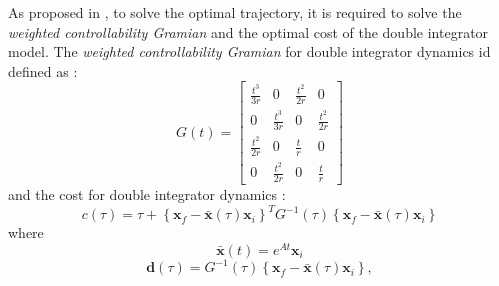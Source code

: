 \documentclass[conference]{IEEEtran}
\begin{document}
As proposed in \cite{webb2013kinodynamic}, to solve the optimal trajectory, it is required to solve the \emph{weighted controllability Gramian} and the optimal cost of the double integrator model. The \emph{weighted controllability Gramian} for double integrator dynamics id defined as :
\begin{equation} \label{dbl_int_gramian_eq}
G(t)=\begin{bmatrix}
\frac{t^{3}}{3r} & 0 & \frac{t^{2}}{2r} & 0 \\
0 & \frac{t^{3}}{3r} & 0 & \frac{t^{2}}{2r} \\
\frac{t^{2}}{2r} & 0 & \frac{t}{r} & 0\\
0 & \frac{t^{2}}{2r} & 0 & \frac{t}{r}
\end{bmatrix}
\end{equation}
and the cost for double integrator dynamics :
\begin{equation} \label{dbl_int_cost_eq}
c(\tau) =
\tau +
\left \{  
\boldsymbol{x}_f -
\bar{\boldsymbol{x}}(\tau)
\boldsymbol{x}_i
\right \}^{T}
G^{-1}(\tau)
\left \{  
\boldsymbol{x}_f -
\bar{\boldsymbol{x}}(\tau)
\boldsymbol{x}_i
\right \}
\end{equation}
where
\begin{equation} \label{ext_dbl_int_eq}
\bar{\boldsymbol{x}}(t) =
e^{At} \boldsymbol{x}_i 
\end{equation}
\begin{equation} \label{d_sym_dbl_int_eq}
\boldsymbol{d}(\tau) =
G^{-1}(\tau)
\left \{
\boldsymbol{x}_f -
\bar{\boldsymbol{x}}(\tau)
\boldsymbol{x}_i \right \},
\end{equation}
\end{document}
